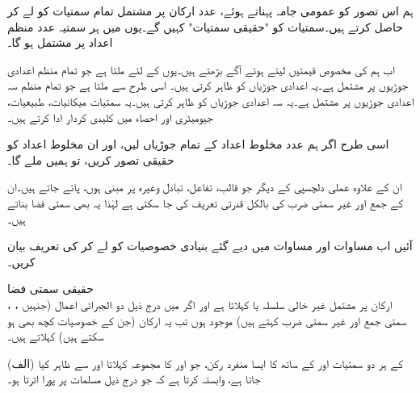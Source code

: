 ہم اس تصور کو عمومی جامہ پہناتے ہوئے،  عدد ارکان پر مشتمل تمام سمتیات کو لے کر   حاصل کرتے ہیں۔سمتیات کو "حقیقی سمتیات" کہیں گے۔یوں  میں ہر سمتیہ  عدد منظم اعداد پر مشتمل ہو گا۔

اب ہم  کی مخصوص قیمتیں لیتے ہوئے آگے بڑھتے ہیں۔یوں  کے لئے  ملتا ہے جو تمام منظم اعدادی جوڑیوں پر مشتمل ہے۔یہ اعدادی جوڑیاں  کو ظاہر کرتی ہیں۔ اسی طرح  سے  ملتا ہے جو  تمام منظم سہ اعدادی جوڑیوں پر مشتمل ہے۔یہ سہ اعدادی جوڑیاں  کو ظاہر کرتی ہیں۔یہ سمتیات میکانیات، طبیعیات، جیومیٹری اور احصاء میں کلیدی کردار ادا کرتے ہیں۔

اسی طرح اگر ہم   عدد مخلوط اعداد کے تمام جوڑیاں لیں، اور ان مخلوط اعداد کو حقیقی تصور کریں، تو ہمیں   ملے گا۔ 

ان کے علاوہ عملی دلچسپی کے دیگر   جو قالب، تفاعل، تبادل وغیرہ پر مبنی ہوں، پائے جاتے ہیں۔ان کے جمع اور غیر سمتی ضرب کی بالکل قدرتی تعریف کی جا سکتی ہے لہٰذا یہ بھی سمتی فضا بناتے ہیں۔     

آئیں اب مساوات  اور مساوات  میں دیے گئے  بنیادی خصوصیات کو لے کر   کی تعریف بیان کریں۔

\quad حقیقی سمتی فضا\\
، ،  ارکان پر مشتمل غیر خالی سلسلہ   یا  کہلاتا ہے اور اگر  میں درج ذیل دو الجبرائی اعمال (جنہیں سمتی جمع اور غیر سمتی ضرب کہتے ہیں) موجود ہوں تب یہ ارکان (جن کے خصوصیات کچھ بھی ہو سکتے ہیں)   کہلاتے ہیں۔

(الف)\quad {}  کے ہر دو سمتیات  اور  کے ساتھ  کا ایسا منفرد رکن، جو  اور  کا مجموعہ کہلاتا  اور  سے ظاہر کیا جاتا ہے،  وابستہ  کرتا ہے کہ جو درج ذیل مسلمات پر پورا اترتا ہو۔

